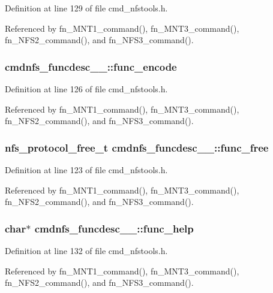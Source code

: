 Definition at line 129 of file cmd\_\-nfstools.h.

Referenced by fn\_\-MNT1\_\-command(), fn\_\-MNT3\_\-command(), fn\_\-NFS2\_\-command(), and fn\_\-NFS3\_\-command().
\subsubsection{ {\bf cmdnfs\_\-funcdesc\_\-\_\-::func\_\-encode}}\label{structcmdnfs__funcdesc_____o3}




Definition at line 126 of file cmd\_\-nfstools.h.

Referenced by fn\_\-MNT1\_\-command(), fn\_\-MNT3\_\-command(), fn\_\-NFS2\_\-command(), and fn\_\-NFS3\_\-command().
\subsubsection{\setlength{\rightskip}{0pt plus 5cm}nfs\_\-protocol\_\-free\_\-t {\bf cmdnfs\_\-funcdesc\_\-\_\-::func\_\-free}}\label{structcmdnfs__funcdesc_____o2}




Definition at line 123 of file cmd\_\-nfstools.h.

Referenced by fn\_\-MNT1\_\-command(), fn\_\-MNT3\_\-command(), fn\_\-NFS2\_\-command(), and fn\_\-NFS3\_\-command().
\subsubsection{\setlength{\rightskip}{0pt plus 5cm}char$\ast$ {\bf cmdnfs\_\-funcdesc\_\-\_\-::func\_\-help}}\label{structcmdnfs__funcdesc_____o5}




Definition at line 132 of file cmd\_\-nfstools.h.

Referenced by fn\_\-MNT1\_\-command(), fn\_\-MNT3\_\-command(), fn\_\-NFS2\_\-command(), and fn\_\-NFS3\_\-command().

